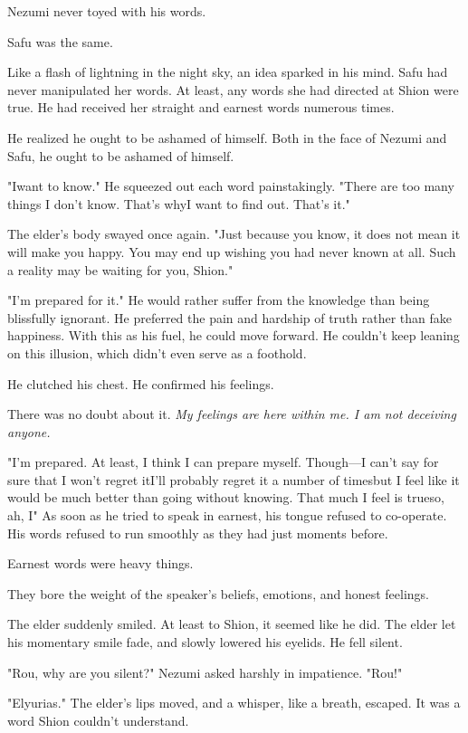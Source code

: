 Nezumi never toyed with his words.

Safu was the same.

Like a flash of lightning in the night sky, an idea sparked in his mind.
Safu had never manipulated her words. At least, any words she had
directed at Shion were true. He had received her straight and earnest
words numerous times.

He realized he ought to be ashamed of himself. Both in the face of
Nezumi and Safu, he ought to be ashamed of himself.

"I\el want to know." He squeezed out each word painstakingly. "There are
too many things I don't know. That's why\el I want to find out. That's
it."

The elder's body swayed once again. "Just because you know, it does not
mean it will make you happy. You may end up wishing you had never known
at all. Such a reality may be waiting for you, Shion."

"I'm prepared for it." He would rather suffer from the knowledge than
being blissfully ignorant. He preferred the pain and hardship of truth
rather than fake happiness. With this as his fuel, he could move
forward. He couldn't keep leaning on this illusion, which didn't even
serve as a foothold.

He clutched his chest. He confirmed his feelings.

There was no doubt about it. \emph{My feelings are here within me. I am not
deceiving anyone.}

"I'm prepared. At least, I think I can prepare myself. Though---I can't
say for sure that I won't regret it\el I'll probably regret it a number
of times\el but I feel like it would be much better than going without
knowing. That much I feel is true\el so, ah, I\el " As soon as he tried
to speak in earnest, his tongue refused to co-operate. His words refused
to run smoothly as they had just moments before.

Earnest words were heavy things.

They bore the weight of the speaker's beliefs, emotions, and honest
feelings.

The elder suddenly smiled. At least to Shion, it seemed like he did. The
elder let his momentary smile fade, and slowly lowered his eyelids. He
fell silent.

"Rou, why are you silent?" Nezumi asked harshly in impatience. "Rou!"

"Elyurias." The elder's lips moved, and a whisper, like a breath,
escaped. It was a word Shion couldn't understand.

